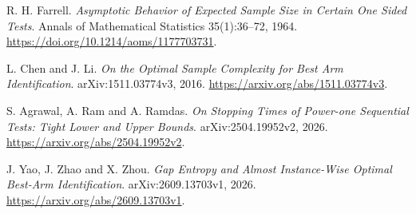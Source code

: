  R. H. Farrell.
\emph{Asymptotic Behavior of Expected Sample Size in Certain One Sided Tests}.
Annals of Mathematical Statistics 35(1):36--72, 1964.
\url{https://doi.org/10.1214/aoms/1177703731}.

 L. Chen and J. Li.
\emph{On the Optimal Sample Complexity for Best Arm Identification}.
arXiv:1511.03774v3, 2016.
\url{https://arxiv.org/abs/1511.03774v3}.

 S. Agrawal, A. Ram and A. Ramdas.
\emph{On Stopping Times of Power-one Sequential Tests: Tight Lower and Upper Bounds}.
arXiv:2504.19952v2, 2026.
\url{https://arxiv.org/abs/2504.19952v2}.

 J. Yao, J. Zhao and X. Zhou.
\emph{Gap Entropy and Almost Instance-Wise Optimal Best-Arm Identification}.
arXiv:2609.13703v1, 2026.
\url{https://arxiv.org/abs/2609.13703v1}.
